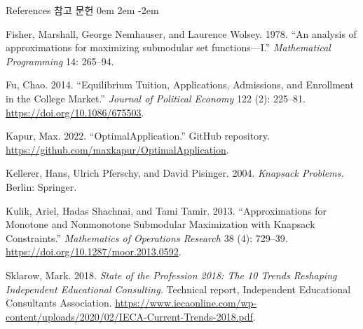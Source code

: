 \documentclass[11pt,mathserif,notheorems]{beamer}
\theoremstyle{definition}
\theoremstyle{definition}
\begin{document}
\begin{frame}{\ifen References \else 참고 문헌 \fi}
\small
\parskip 0em
\leftskip 2em
\parindent -2em


Fisher, Marshall, George Nemhauser, and Laurence Wolsey. 1978. ``An analysis of approximations for maximizing submodular set functions—I.'' \emph{Mathematical Programming} 14: 265--94.

Fu, Chao. 2014. ``Equilibrium Tuition, Applications, Admissions, and Enrollment in the College Market.'' \emph{Journal of Political Economy} 122 (2): 225--81. \url{https://doi.org/10.1086/675503}. 

Kapur, Max. 2022. ``OptimalApplication.'' GitHub repository. \url{https://github.com/maxkapur/OptimalApplication}.


Kellerer, Hans, Ulrich Pferschy, and David Pisinger. 2004. \emph{Knapsack Problems.} Berlin: Springer.

Kulik, Ariel, Hadas Shachnai, and Tami Tamir. 2013. ``Approximations for Monotone and Nonmonotone Submodular Maximization with Knapsack Constraints.'' \emph{Mathematics of Operations Research} 38 (4): 729--39. \url{https://doi.org/10.1287/moor.2013.0592}.

%

Sklarow, Mark. 2018. \emph{State of the Profession 2018: The 10 Trends Reshaping Independent Educational Consulting.} Technical report, Independent Educational Consultants Association. \url{https://www.iecaonline.com/wp-content/uploads/2020/02/IECA-Current-Trends-2018.pdf}.

\end{frame}
\end{document}
